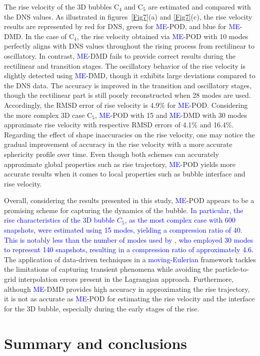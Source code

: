 \documentclass[a4paper,fleqn]{cas-sc}
\newcommand{\hl}[1]{\textcolor{blue}{#1}} %
\newcommand{\hl}[1]{#1} %
\begin{document}
	The rise velocity of the 3D bubbles C$_4$ and C$_5$ are estimated and compared with the DNS values. As illustrated in figures~\ref{Fig7}(a) and \ref{Fig7}(c), the rise velocity results are represented by red for DNS, green for \hl{ME}-POD, and blue for \hl{ME}-DMD. In the case of C$_4$, the rise velocity obtained via \hl{ME}-POD with 10 modes perfectly aligns with DNS values throughout the rising process from rectilinear to oscillatory. In contrast, \hl{ME}-DMD fails to provide correct results during the rectilinear and transition stages. The oscillatory behavior of the rise velocity is slightly detected using \hl{ME}-DMD, though it exhibits large deviations compared to the DNS data. The accuracy is improved in the transition and oscillatory stages, though the rectilinear part is still poorly reconstructed when 28 modes are used. Accordingly, the RMSD error of rise velocity is 4.9\% for \hl{ME}-POD. Considering the more complex 3D case C$_5$, \hl{ME}-POD with 15 and \hl{ME}-DMD with 30 modes approximate rise velocity with respective RMSD errors of 4.1\% and 16.4\%. Regarding the effect of shape inaccuracies on the rise velocity, one may notice the gradual improvement of accuracy in the rise velocity with a more accurate sphericity profile over time. Even though both schemes can accurately approximate global properties such as rise trajectory, \hl{ME}-POD yields more accurate results when it comes to local properties such as bubble interface and rise velocity.

	Overall, considering the results presented in this study, \hl{ME}-POD appears to be a promising scheme for capturing the dynamics of the bubble. \hl{In particular, the rise characteristics of the 3D bubble $C_5$, as the most complex case with 600 snapshots, were estimated using 15 modes, yielding a compression ratio of 40. This is notably less than the number of modes used by \citet{Yin2023a}, who employed 30 modes to represent 140 snapshots, resulting in a compression ratio of approximately 4.6.} The application of data-driven techniques in a \hl{moving-Eulerian} framework tackles the limitations of capturing transient phenomena while avoiding the particle-to-grid interpolation errors present in the Lagrangian approach. Furthermore, although \hl{ME}-DMD provides high accuracy in approximating the rise trajectory, it is not as accurate as \hl{ME}-POD for estimating the rise velocity and the interface for the 3D bubble, especially during the early stages of the rise.
	
	
	\section{Summary and conclusions}
	\label{Conclusion}
	
\end{document}
